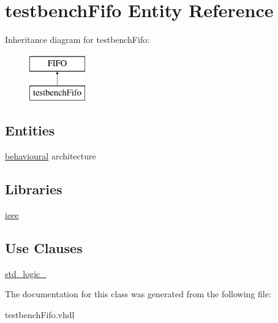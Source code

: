 \hypertarget{classtestbenchFifo}{}\section{testbench\+Fifo Entity Reference}
\label{classtestbenchFifo}
Inheritance diagram for testbench\+Fifo\+:\begin{figure}[H]
\begin{center}
\leavevmode
\includegraphics[height=2.000000cm]{classtestbenchFifo}
\end{center}
\end{figure}
\subsection*{Entities}
\begin{DoxyCompactItemize}
\item 
\hyperlink{classtestbenchFifo_1_1behavioural}{behavioural} architecture
\end{DoxyCompactItemize}
\subsection*{Libraries}
 \begin{DoxyCompactItemize}
\item 
\mbox{\label{classtestbenchFifo_a0a6af6eef40212dbaf130d57ce711256}} 
\hyperlink{classtestbenchFifo_a0a6af6eef40212dbaf130d57ce711256}{ieee} 
\end{DoxyCompactItemize}
\subsection*{Use Clauses}
 \begin{DoxyCompactItemize}
\item 
\mbox{\label{classtestbenchFifo_acd03516902501cd1c7296a98e22c6fcb}} 
\hyperlink{classtestbenchFifo_acd03516902501cd1c7296a98e22c6fcb}{std\+\_\+logic\+\_}   
\end{DoxyCompactItemize}


The documentation for this class was generated from the following file\+:\begin{DoxyCompactItemize}
\item 
testbench\+Fifo.\+vhdl\end{DoxyCompactItemize}
